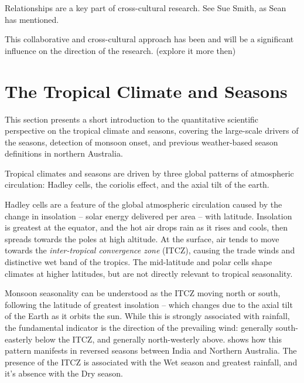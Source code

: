 Relationships are a key part of cross-cultural research.  See Sue Smith, as
Sean has mentioned.

This collaborative and cross-cultural approach has been and will be a
significant influence on the direction of the research. (explore it more then)




\section{The Tropical Climate and Seasons}
\label{sec:lit-tropical-climate}

This section presents a short introduction to the quantitative scientific
perspective on the tropical climate and seasons, covering the large-scale
drivers of the seasons, detection of monsoon onset, and previous
weather-based season definitions in northern Australia.


Tropical climates and seasons are driven by three global patterns of
atmospheric circulation:  Hadley cells, the coriolis effect, and the axial
tilt of the earth.

Hadley cells are a feature of the global atmospheric circulation
caused by the change in insolation -- solar energy delivered per area --
with latitude.  Insolation is greatest at the equator, and the hot air drops
rain as it rises and cools, then spreads towards the poles at high altitude.
At the surface, air tends to move towards the \textit{inter-tropical
convergence zone} (ITCZ), causing the trade winds and distinctive wet band
of the tropics.  The mid-latitude and polar cells shape climates at higher
latitudes, but are not directly relevant to tropical seasonality.

Monsoon seasonality can be understood as the ITCZ moving north or south,
following the latitude of greatest insolation -- which changes due to the
axial tilt of the Earth as it orbits the sun.  While this is strongly
associated with rainfall, the fundamental indicator is the direction of
the prevailing wind: generally south-easterly below the ITCZ, and generally
north-westerly above.   shows how this pattern
manifests in reversed seasons between India and Northern Australia.
The presence of the ITCZ is associated with the Wet season and greatest
rainfall, and it's absence with the Dry season.

